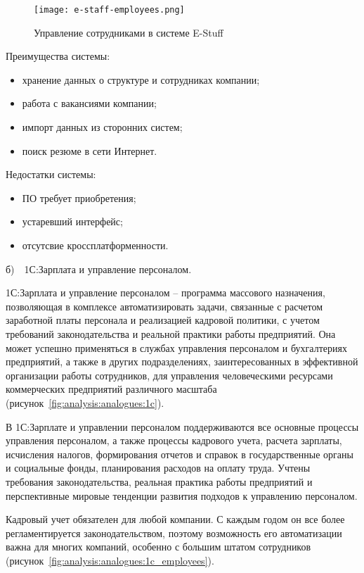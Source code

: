 \begin{figure}[!h]
	\centering
	\texttt{[image: e-staff-employees.png]} 
	\caption{Управление сотрудниками в системе E-Stuff}
	\label{fig:analysis:analogues:e-staff-employees}
\end{figure}

Преимущества системы:
\begin{itemize}
	\item хранение данных о структуре и сотрудниках компании;
	\item работа с вакансиями компании;
	\item импорт данных из сторонних систем;
	\item поиск резюме в сети Интернет.
\end{itemize}

Недостатки системы:
\begin{itemize}
	\item ПО требует приобретения;
	\item устаревший интерфейс;
	\item отсутсвие кроссплатформенности.
\end{itemize}

б)~~1С:Зарплата и управление персоналом.

1С:Зарплата и управление персоналом -- программа массового назначения, позволяющая в комплексе автоматизировать
задачи, связанные с расчетом заработной платы персонала и реализацией кадровой политики, с учетом требований
законодательства и реальной практики работы предприятий. Она может успешно применяться в службах управления персоналом
и бухгалтериях предприятий, а также в других подразделениях, заинтересованных в эффективной организации работы
сотрудников, для управления человеческими ресурсами коммерческих предприятий различного масштаба
(рисунок~\ref{fig:analysis:analogues:1c}).

В 1С:Зарплате и управлении персоналом поддерживаются все основные процессы управления персоналом, а также процессы
кадрового учета, расчета зарплаты, исчисления налогов, формирования отчетов и справок в государственные органы и
социальные фонды, планирования расходов на оплату труда. Учтены требования законодательства, реальная практика работы
предприятий и перспективные мировые тенденции развития подходов к управлению персоналом.

Кадровый учет обязателен для любой компании. С каждым годом он все более регламентируется законодательством, поэтому
возможность его автоматизации важна для многих компаний, особенно с большим штатом сотрудников
(рисунок~\ref{fig:analysis:analogues:1c_employees}).

